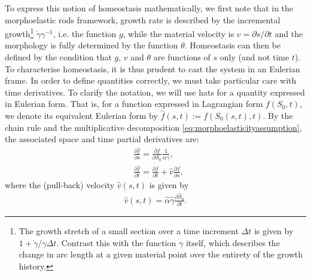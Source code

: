 To express this notion of homeostasis mathematically, we first note that in the morphoelastic rods framework, growth rate is described by the incremental growth\footnote{The growth stretch of a small section over a time increment $\Delta t$ is given by $1+\dot\gamma/\gamma\Delta t$. Contrast this with the function $\gamma$ itself, which describes the change in arc length at a given material point over the entirety of the growth history.} $\dot\gamma\gamma^{-1}$, i.e. the function $g$, while the material velocity is $v=\partial{s}/\partial{t}$ and the morphology is fully determined by the function $\theta$. Homeostasis can then be defined by the condition that $g$, $v$ and $\theta$ are functions of $s$ only (and not time $t$). To characterise homeostasis, it is thus prudent to cast the system in an Eulerian frame. In order to define quantities correctly, we must take particular care with time derivatives. To clarify the notation, we will use hats for a quantity expressed in Eulerian form. That is, for a function expressed in Lagrangian form $f(S_0, t)$, we denote its equivalent Eulerian form by $\hat{f}(s, t) := f(S_0(s, t), t)$. By the chain rule and the multiplicative decomposition \eqref{eq:morphoelasticityassumption}, the associated space and time partial derivatives are:
\begin{align}
&\frac{\partial\hat{f}}{\partial s} = \frac{\partial f}{\partial S_0}\frac{1}{\alpha\gamma},\label{eq:materialspacederivative}\\
&\frac{\partial\hat{f}}{\partial t} = \frac{\partial f}{\partial t} + \hat{v}\frac{\partial f}{\partial s},\label{eq:materialderivative}
\end{align}
where the (pull-back) velocity $\hat{v}(s, t)$ is given by
\begin{align}
\hat{v}(s, t) = \hat{\alpha}\hat{\gamma}\frac{\partial \hat{S}_0}{\partial t}.\label{eq:flowvelocity}
\end{align} 

%

